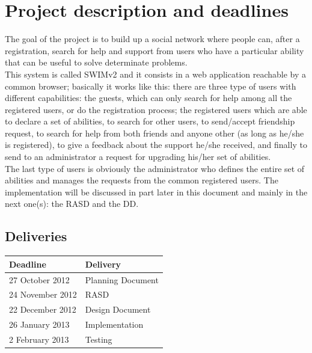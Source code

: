 \documentclass[a4paper,12pt]{article}
\begin{document}
	    \vspace*{\fill}
	\tableofcontents
	    \vspace*{\fill}

\clearpage

\section{Project description and deadlines}
The goal of the project is to build up a social network where people can, after a registration, search for help and support from users who have a particular ability that can be useful to solve determinate problems.\\[1\baselineskip]This system is called SWIMv2 and it consists in a web application reachable by a common browser; basically it works like this: there are three type of users with different capabilities: the guests, which can only search for help among all the registered users, or do the registration process; the registered users which are able to declare a set of abilities, to search for other users, to send/accept friendship request, to search for help from both friends and anyone other (as long as he/she is registered), to give a feedback about the support he/she received, and finally to send to an administrator a request for upgrading his/her set of abilities.\\[1\baselineskip]The last type of users is obviously the administrator who defines the entire set of abilities and manages the requests from the common registered users. The implementation will be discussed in part later in this document and mainly in the next one(s): the RASD and the DD.

\subsection{Deliveries}
\begin{center}

\begin{tabular}{ll}
\rowcolor[gray]{.8}\toprule \textbf{Deadline} & \textbf{Delivery} \\
\midrule 27 October 2012 & Planning Document \\
\midrule 24 November 2012 & RASD \\ 
\midrule 22 December 2012 & Design Document \\
\midrule 26 January 2013 & Implementation \\
\midrule 2 February 2013 & Testing \\
\bottomrule
\end{tabular}
\end{center}
\end{document}
